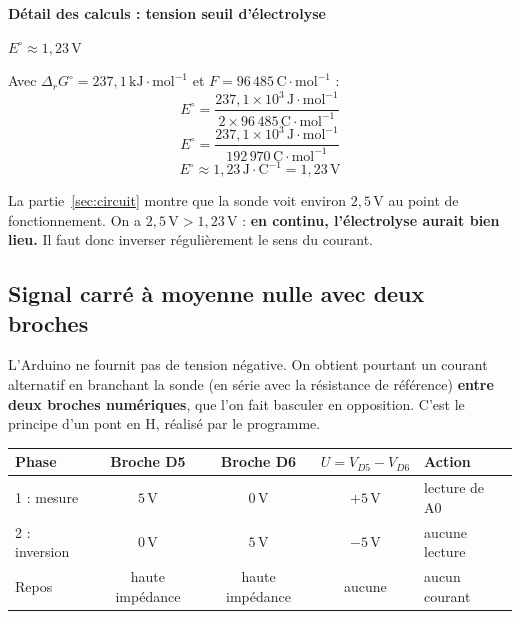 \documentclass[11pt,a4paper]{article}
\newcommand{\resultat}[1]{\begin{center}{\large\color{bleuENO}$\displaystyle #1$}\end{center}}
\newcommand{\calcul}[2]{\par\medskip\noindent\textbf{Détail des calculs : #1}\par\nopagebreak\resultat{#2}}
\newcommand{\ligne}{\arrayrulecolor{ligneENO}\specialrule{0.4pt}{0pt}{0pt}\arrayrulecolor{black}}
\newcommand{\U}[1]{\,\mathrm{#1}}
\begin{document}
\calcul{tension seuil d'électrolyse}{E^\circ \approx 1{,}23\,\mathrm{V}}
Avec $\Delta_r G^\circ = 237{,}1\U{kJ \cdot mol^{-1}}$ et $F = 96\,485\U{C \cdot mol^{-1}}$ :
\[
E^\circ = \frac{237{,}1 \times 10^{3}\U{J \cdot mol^{-1}}}{2 \times 96\,485\U{C \cdot mol^{-1}}}
\]
\[
E^\circ = \frac{237{,}1 \times 10^{3}\U{J \cdot mol^{-1}}}{192\,970\U{C \cdot mol^{-1}}}
\]
\[
E^\circ \approx 1{,}23\U{J \cdot C^{-1}} = 1{,}23\U{V}
\]

La partie~\ref{sec:circuit} montre que la sonde voit environ $2{,}5\U{V}$ au point de fonctionnement. On a $2{,}5\U{V} > 1{,}23\U{V}$ : \textbf{en continu, l'électrolyse aurait bien lieu.} Il faut donc inverser régulièrement le sens du courant.

\subsection{Signal carré à moyenne nulle avec deux broches}

L'Arduino ne fournit pas de tension négative. On obtient pourtant un courant alternatif en branchant la sonde (en série avec la résistance de référence) \textbf{entre deux broches numériques}, que l'on fait basculer en opposition. C'est le principe d'un pont en H, réalisé par le programme.

\begin{center}
\begin{tabular}{l c c c l}
\toprule
\textbf{Phase} & \textbf{Broche D5} & \textbf{Broche D6} & \textbf{$U = V_{D5} - V_{D6}$} & \textbf{Action} \\
\midrule
1 : mesure & $5\U{V}$ & $0\U{V}$ & $+5\U{V}$ & lecture de A0 \\ \ligne
2 : inversion & $0\U{V}$ & $5\U{V}$ & $-5\U{V}$ & aucune lecture \\ \ligne
Repos & haute impédance & haute impédance & aucune & aucun courant \\
\bottomrule
\end{tabular}
\end{center}
\end{document}
